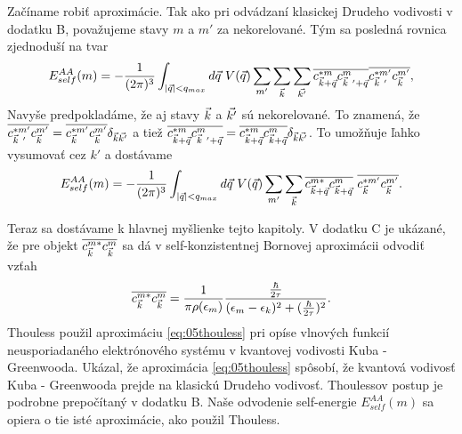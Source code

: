Začíname robiť aproximácie. Tak ako pri odvádzaní klasickej Drudeho vodivosti v dodatku B, považujeme stavy $m$ a $m'$ za nekorelované. Tým sa posledná rovnica zjednoduší na tvar
\begin{align}
E_{self}^{AA}(m)= - \frac{1}{(2\pi)^3}\int_{|\vq| < q_{max}} d\vq\ V(\vq) \sum_{m'}\sum_{\vk}\sum_{\vkp}\overline{c^{*m}_{\vk+\vq}c^{m}_{\vk\ '+\vq}}\overline{c^{*m'}_{\vk\ '}c^{m'}_{\vk}}\text{,}
\end{align}
Navyše predpokladáme, že aj stavy $\vec{k}$ a $\vec{k'}$ sú nekorelované. To znamená, že $\overline{c^{*m'}_{\vec{k}\ '}c^{m'}_{\vec{k}}} = \overline{c^{*m'}_{\vec{k}}c^{m'}_{\vec{k}}}\delta_{\vec{k}\vec{k'}}$ a
tiež $\overline{c^{*m}_{\vec{k}+\vec{q}}c^{m}_{\vec{k}\ '+\vec{q}}} = \overline{c^{*m}_{\vec{k}+\vec{q}}c^{m}_{\vec{k} +\vec{q}}} \delta_{\vec{k}\vec{k'}}$.
To umožňuje ľahko vysumovať cez $k'$ a dostávame
\begin{align}
\label{eq:05energy2}
E_{self}^{AA}(m)= - \frac{1}{(2\pi)^3} \int_{|\vq| < q_{max}} d\vq\ V(\vq) \sum_{m'}\sum_{\vk} \overline{c^{m*}_{\vk+\vq}c^{m}_{\vk+\vq}}\ \overline{c^{*m'}_{\vk}c^{m'}_{\vk}} \text{.}
\end{align}

Teraz sa dostávame k hlavnej myšlienke tejto kapitoly. V dodatku C je ukázané, že pre objekt $\overline{c^{m*}_{\vec{k}}c^{m}_{\vec{k}}}$ sa dá v self-konzistentnej Bornovej aproximácii  odvodiť vzťah
\begin{align}
\label{eq:05thouless}
\overline{c^{m*}_{\vec{k}}c^{m}_{\vec{k}}}=\frac{1}{\pi \rho(\epsilon_m)}\frac{\frac{\hbar}{2\tau}}{(\epsilon_m-\epsilon_{k})^2+(\frac{\hbar}{2\tau})^2} \text{.}
\end{align}
Thouless \cite{Thouless} použil aproximáciu \eqref{eq:05thouless} pri opíse vlnových funkcií neusporiadaného elektrónového systému v kvantovej vodivosti Kuba - Greenwooda.
Ukázal, že aproximácia \eqref{eq:05thouless} spôsobí, že kvantová vodivosť Kuba - Greenwooda prejde na klasickú Drudeho vodivosť. Thoulessov postup je podrobne prepočítaný v dodatku B.
Naše odvodenie self-energie  $E_{self}^{AA}(m)$ sa opiera o tie isté aproximácie, ako použil Thouless.



